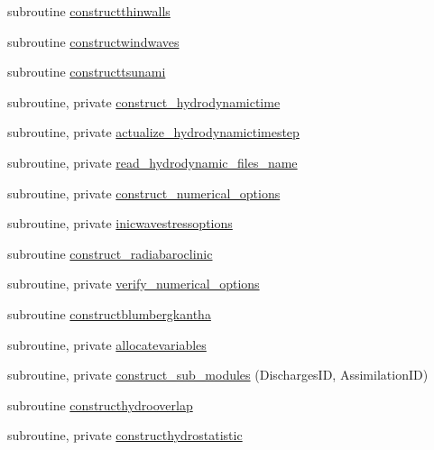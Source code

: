 \begin{DoxyCompactItemize}
subroutine \mbox{\hyperlink{namespacemodulehydrodynamic_a072dc4d4b10aa4a8338fa245f13abfec}{constructthinwalls}}
\item 
subroutine \mbox{\hyperlink{namespacemodulehydrodynamic_acf1676d4429b32307257ed7006fc59e1}{constructwindwaves}}
\item 
subroutine \mbox{\hyperlink{namespacemodulehydrodynamic_a4884a32bf5be45ca0a9b657f2998efa7}{constructtsunami}}
\item 
subroutine, private \mbox{\hyperlink{namespacemodulehydrodynamic_adacb48ce53fa202c94f8c282a714e069}{construct\+\_\+hydrodynamictime}}
\item 
subroutine, private \mbox{\hyperlink{namespacemodulehydrodynamic_a1df79abd6d7bd327711cac635586b443}{actualize\+\_\+hydrodynamictimestep}}
\item 
subroutine, private \mbox{\hyperlink{namespacemodulehydrodynamic_a38cc357414f891bddecb56ab805ed45b}{read\+\_\+hydrodynamic\+\_\+files\+\_\+name}}
\item 
subroutine, private \mbox{\hyperlink{namespacemodulehydrodynamic_aec1826f2eaf93245fac759d36238b464}{construct\+\_\+numerical\+\_\+options}}
\item 
subroutine, private \mbox{\hyperlink{namespacemodulehydrodynamic_a95bd184509c8f6ec79226d6c0d2fac28}{inicwavestressoptions}}
\item 
subroutine \mbox{\hyperlink{namespacemodulehydrodynamic_a2c1b59ad00ab5b15fcde63fd663d2f54}{construct\+\_\+radiabaroclinic}}
\item 
subroutine, private \mbox{\hyperlink{namespacemodulehydrodynamic_a7c3dd39beec17720b08c54e61c02ecc8}{verify\+\_\+numerical\+\_\+options}}
\item 
subroutine \mbox{\hyperlink{namespacemodulehydrodynamic_afd2aaa7b8dac18e2bd28abcf31a9cb16}{constructblumbergkantha}}
\item 
subroutine, private \mbox{\hyperlink{namespacemodulehydrodynamic_a0f6a249ae16b4abbfcead3fdc4641a89}{allocatevariables}}
\item 
subroutine, private \mbox{\hyperlink{namespacemodulehydrodynamic_acaa5f838138b21f2c4d3c245177ae6bf}{construct\+\_\+sub\+\_\+modules}} (Discharges\+ID, Assimilation\+ID)
\item 
subroutine \mbox{\hyperlink{namespacemodulehydrodynamic_a144fedbdcc486e7eda6dcae5d0b49d78}{constructhydrooverlap}}
\item 
subroutine, private \mbox{\hyperlink{namespacemodulehydrodynamic_a03c47a8a1c14b9e6471a24944ad9aae5}{constructhydrostatistic}}
\item 

\end{DoxyCompactItemize}
